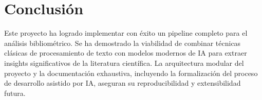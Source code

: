 \documentclass[12pt, a4paper]{article}
\begin{document}
\section{Conclusión}
Este proyecto ha logrado implementar con éxito un pipeline completo para el análisis bibliométrico. Se ha demostrado la viabilidad de combinar técnicas clásicas de procesamiento de texto con modelos modernos de IA para extraer insights significativos de la literatura científica. La arquitectura modular del proyecto y la documentación exhaustiva, incluyendo la formalización del proceso de desarrollo asistido por IA, aseguran su reproducibilidad y extensibilidad futura.
\end{document}
